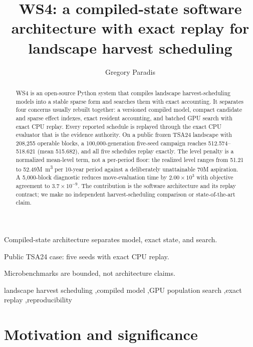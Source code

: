 \documentclass[a4paper,fleqn]{cas-sc}
\begin{document}
\let\WriteBookmarks\relax
\def\floatpagepagefraction{1}
\def\textpagefraction{.001}
\title[mode=title]{WS4: a compiled-state software architecture with exact replay for landscape harvest scheduling}
\author[1]{Gregory Paradis}
\cormark[1]
\begin{abstract}
WS4 is an open-source Python system that compiles landscape harvest-scheduling models into a stable
sparse form and searches them with exact accounting. It separates four concerns usually rebuilt
together: a versioned compiled model, compact candidate and sparse effect indexes, exact resident
accounting, and batched GPU search with exact CPU replay. Every reported schedule is replayed through
the exact CPU evaluator that is the evidence authority. On a public frozen TSA24 landscape with 208,255
operable blocks, a 100,000-generation five-seed campaign reaches 512.574--518.621 (mean 515.682), and
all five schedules replay exactly. The level penalty is a normalized mean-level term, not a per-period
floor: the realized level ranges from 51.21 to 52.49M~m\textsuperscript{3} per 10-year period
against a deliberately unattainable 70M aspiration. A 5,000-block diagnostic reduces move-evaluation
time by $2.00\times10^{3}$ with objective agreement to $3.7\times10^{-9}$. The contribution is the software architecture
and its replay contract; we make no independent harvest-scheduling comparison or state-of-the-art claim.
\end{abstract}
\begin{highlights}
\item Compiled-state architecture separates model, exact state, and search.
\item Public TSA24 case: five seeds with exact CPU replay.
\item Microbenchmarks are bounded, not architecture claims.
\end{highlights}
\begin{keywords}
landscape harvest scheduling \sep compiled model \sep GPU population search \sep exact replay \sep reproducibility
\end{keywords}
\maketitle



\section{Motivation and significance}
\end{document}
